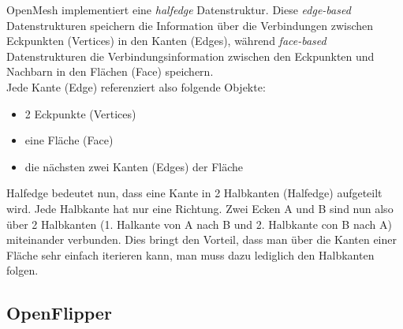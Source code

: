 OpenMesh implementiert eine \emph{halfedge} Datenstruktur.
Diese \emph{edge-based} Datenstrukturen speichern die Information über die Verbindungen zwischen Eckpunkten (Vertices) in den Kanten (Edges), während
\emph{face-based} Datenstrukturen die Verbindungsinformation zwischen den Eckpunkten und Nachbarn in den Flächen (Face) speichern.\\
Jede Kante (Edge) referenziert also folgende Objekte:
\begin{itemize}
	\item 2 Eckpunkte (Vertices)
	\item eine Fläche (Face)
	\item die nächsten zwei Kanten (Edges) der Fläche
\end{itemize}

Halfedge bedeutet nun, dass eine Kante in 2 Halbkanten (Halfedge) aufgeteilt wird. Jede Halbkante hat nur eine Richtung.
Zwei Ecken A und B sind nun also über 2 Halbkanten (1. Halkante von A nach B und 2. Halbkante con B nach A) miteinander verbunden.
Dies bringt den Vorteil, dass man über die Kanten einer Fläche sehr einfach iterieren kann, man muss dazu lediglich den Halbkanten folgen.

\subsection{OpenFlipper}


